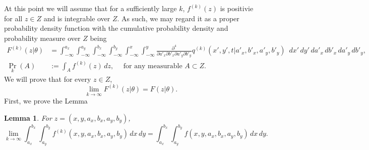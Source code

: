 \documentclass[10pt]{article}
\newtheorem{lemma}{Lemma}
\begin{document}
At this point we will assume that for a sufficiently large $k$,
$f^{(k)}(z)$ is positivie for all $z \in Z$ and is integrable over
$Z$. As such, we may regard it as a proper probability density
function with the cumulative probability density and probability
measure over $Z$ being 
\begin{align}
  F^{(k)}(z | \theta) &= \displaystyle \int_{-\infty}^{a_x} \displaystyle \int_{-\infty}^{a_y} \displaystyle \int_{-\infty}^{b_x} \displaystyle \int_{-\infty}^{b_y} \displaystyle \int_{-\infty}^x \displaystyle \int_{-\infty}^y \frac{\partial^4}{\partial a'_x \partial b'_x \partial a'_y \partial b'_y} q^{(k)}(x', y', t | a'_x, b'_x, a'_y, b'_y)\,\,\, dx'\, dy'\, da'_x\, db'_x\, da'_y\, db'_y, \label{eq:approx-measure} \\
                          \Pr_{k}(A) &:= \displaystyle \int_{A} f^{(k)}(z)\, dz, \quad \mbox{ for any measurable } A \subset Z. \label{eq:approx-measure-2}
\end{align}
We will prove that for every $z \in Z$,
\[
  \lim_{k\to \infty} F^{(k)}(z | \theta) = F(z | \theta).
\]
First, we prove the Lemma
\begin{lemma}\label{lem:1}
  For $z = (x, y, a_x, b_x, a_y, b_y)$,
  \[
    \lim_{k\to \infty} \displaystyle \int_{a_x}^{b_x} \displaystyle
    \int_{a_y}^{b_y} f^{(k)}(x,y,a_x,b_x,a_y,b_y)\, dx\,dy =
    \displaystyle \int_{a_x}^{b_x} \displaystyle \int_{a_y}^{b_y}
    f(x,y,a_x,b_x,a_y,b_y)\, dx\,dy.
  \]
\end{lemma}
\end{document}
